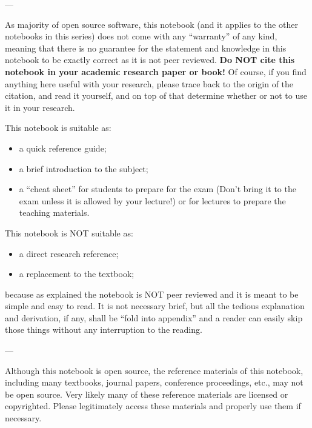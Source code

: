 \noindent ---

\noindent As majority of open source software, this notebook (and it applies to the other notebooks in this series) does not come with any ``warranty'' of any kind, meaning that there is no guarantee for the statement and knowledge in this notebook to be exactly correct as it is not peer reviewed. \textbf{Do NOT cite this notebook in your academic research paper or book!} Of course, if you find anything here useful with your research, please trace back to the origin of the citation, and read it yourself, and on top of that determine whether or not to use it in your research.

This notebook is suitable as:
\begin{itemize}
  \item a quick reference guide;
  \item a brief introduction to the subject;
  \item a ``cheat sheet'' for students to prepare for the exam (Don't bring it to the exam unless it is allowed by your lecture!) or for lectures to prepare the teaching materials.
\end{itemize}

This notebook is NOT suitable as:
\begin{itemize}
  \item a direct research reference;
  \item a replacement to the textbook;
\end{itemize}
because as explained the notebook is NOT peer reviewed and it is meant to be simple and easy to read. It is not necessary brief, but all the tedious explanation and derivation, if any, shall be ``fold into appendix'' and a reader can easily skip those things without any interruption to the reading.

\noindent ---

Although this notebook is open source, the reference materials of this notebook, including many textbooks, journal papers, conference proceedings, etc., may not be open source. Very likely many of these reference materials are licensed or copyrighted. Please legitimately access these materials and properly use them if necessary. \vadjust{\vfill\pagebreak}

